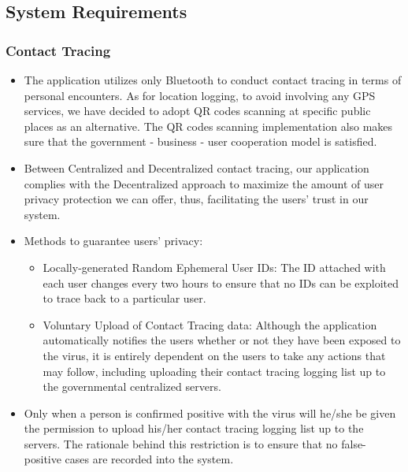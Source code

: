   \subsection{System Requirements}
    \subsubsection{Contact Tracing}
      \begin{itemize}
        \item The application utilizes only Bluetooth to conduct contact tracing in terms of personal encounters. As for location logging, to avoid involving any GPS services, we have decided to adopt QR codes scanning at specific public places as an alternative. The QR codes scanning implementation also makes sure that the government - business - user cooperation model is satisfied.
        \item Between Centralized and Decentralized contact tracing, our application complies with the Decentralized approach to maximize the amount of user privacy protection we can offer, thus, facilitating the users' trust in our system.
        \item Methods to guarantee users' privacy:
          \begin{itemize}
            \item Locally-generated Random Ephemeral User IDs: The ID attached with each user changes every two hours to ensure that no IDs can be exploited to trace back to a particular user.
            \item Voluntary Upload of Contact Tracing data: Although the application automatically notifies the users whether or not they have been exposed to the virus, it is entirely dependent on the users to take any actions that may follow, including uploading their contact tracing logging list up to the governmental centralized servers.
          \end{itemize}
        \item Only when a person is confirmed positive with the virus will he/she be given the permission to upload his/her contact tracing logging list up to the servers. The rationale behind this restriction is to ensure that no false-positive cases are recorded into the system.
      \end{itemize}
    
